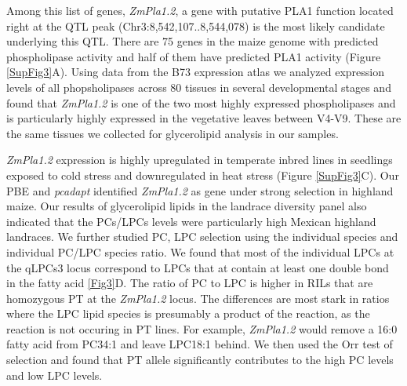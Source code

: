 \documentclass[9pt,twocolumn,twoside,lineno]{gsajnl}
\begin{document}
Among this list of genes, \textit{ZmPla1.2}, a gene with putative PLA1 function located right at the QTL peak (Chr3:8,542,107..8,544,078) is the most likely candidate underlying this QTL. 
There are 75 genes in the maize genome with predicted phospholipase activity and half of them have predicted PLA1 activity (Figure \ref{SupFig3}A). 
Using data from the B73 expression atlas \cite{Stelpflug2016-vr} we analyzed expression levels of all phopsholipases across 80 tissues in several developmental stages and found that \textit{ZmPla1.2} is one of the two most highly expressed phospholipases and is particularly highly expressed in the vegetative leaves between V4-V9. These are the same tissues we collected for glycerolipid analysis in our samples. 

\textit{ZmPla1.2} expression is highly upregulated in temperate inbred lines in seedlings exposed to cold stress and downregulated in heat stress (Figure \ref{SupFig3}C). 
Our PBE and \textit{pcadapt} identified \textit{ZmPla1.2} as gene under strong selection in highland maize. 
Our results of glycerolipid lipids in the landrace diversity panel also  indicated that the PCs/LPCs levels were particularly high Mexican highland landraces. 
We further studied PC, LPC selection using the individual species and individual PC/LPC species ratio. 
We found that most of the individual LPCs at the qLPCs3 locus correspond to LPCs that at contain at least one double bond in the fatty acid \ref{Fig3}D. The ratio of PC to LPC is higher in RILs that are homozygous PT at the \textit{ZmPla1.2} locus. The differences are most stark in ratios where the LPC lipid species is presumably a product of the reaction, as the reaction is not occuring in PT lines. For example, \textit{ZmPla1.2} would remove a 16:0 fatty acid from PC34:1 and leave LPC18:1 behind. We then used the Orr test of selection and found that PT allele significantly contributes to the high PC levels and low LPC levels. 
\end{document}
